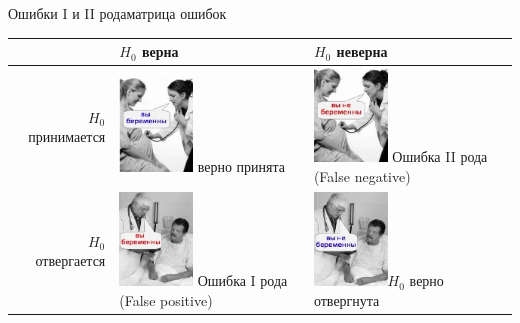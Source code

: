 \documentclass[11pt,pdf,utf8,hyperref={unicode},aspectratio=169]{beamer}
\begin{document}
\begin{frame}{Ошибки I и II рода}{матрица ошибок}

	\begin{center}
    \begin{tabular}{ |r | >{\centering}p{5.5cm} | >{\centering}p{5.5cm} | }
        \hline
        & $H_0$ верна         & $H_0$ неверна \tabularnewline \hline
        $H_0$ принимается & \includegraphics[height=2.5cm]{TP.png}
        \newline верно принята
        & \includegraphics[height=2.5cm]{FN.png}
        \newline Ошибка II рода (False negative)
        \tabularnewline \hline
        $H_0$ отвергается & \includegraphics[height=2.5cm]{FP.png}
        \newline Ошибка I рода (False positive) & \includegraphics[height=2.5cm]{TN.png}$H_0$
        \newline верно отвергнута
         \tabularnewline
        \hline
    \end{tabular}
    \end{center}

\end{frame}
\end{document}
